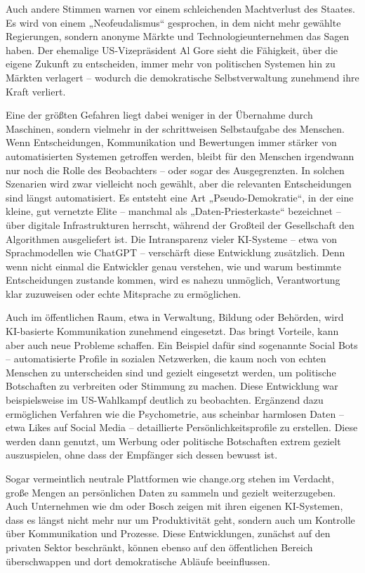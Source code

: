 \documentclass[utf8,biblatex]{bremerhaven_lni}
\begin{document}
Auch andere Stimmen warnen vor einem schleichenden Machtverlust des Staates. Es wird von einem „Neofeudalismus“ gesprochen, in dem nicht mehr gewählte Regierungen, sondern anonyme Märkte und Technologieunternehmen das Sagen haben. Der ehemalige US-Vizepräsident Al Gore sieht die Fähigkeit, über die eigene Zukunft zu entscheiden, immer mehr von politischen Systemen hin zu Märkten verlagert – wodurch die demokratische Selbstverwaltung zunehmend ihre Kraft verliert.

Eine der größten Gefahren liegt dabei weniger in der Übernahme durch Maschinen, sondern vielmehr in der schrittweisen Selbstaufgabe des Menschen. Wenn Entscheidungen, Kommunikation und Bewertungen immer stärker von automatisierten Systemen getroffen werden, bleibt für den Menschen irgendwann nur noch die Rolle des Beobachters – oder sogar des Ausgegrenzten. In solchen Szenarien wird zwar vielleicht noch gewählt, aber die relevanten Entscheidungen sind längst automatisiert. Es entsteht eine Art „Pseudo-Demokratie“, in der eine kleine, gut vernetzte Elite – manchmal als „Daten-Priesterkaste“ bezeichnet – über digitale Infrastrukturen herrscht, während der Großteil der Gesellschaft den Algorithmen ausgeliefert ist. Die Intransparenz vieler KI-Systeme – etwa von Sprachmodellen wie ChatGPT – verschärft diese Entwicklung zusätzlich. Denn wenn nicht einmal die Entwickler genau verstehen, wie und warum bestimmte Entscheidungen zustande kommen, wird es nahezu unmöglich, Verantwortung klar zuzuweisen oder echte Mitsprache zu ermöglichen.

Auch im öffentlichen Raum, etwa in Verwaltung, Bildung oder Behörden, wird KI-basierte Kommunikation zunehmend eingesetzt. Das bringt Vorteile, kann aber auch neue Probleme schaffen. Ein Beispiel dafür sind sogenannte Social Bots – automatisierte Profile in sozialen Netzwerken, die kaum noch von echten Menschen zu unterscheiden sind und gezielt eingesetzt werden, um politische Botschaften zu verbreiten oder Stimmung zu machen. Diese Entwicklung war beispielsweise im US-Wahlkampf deutlich zu beobachten. Ergänzend dazu ermöglichen Verfahren wie die Psychometrie, aus scheinbar harmlosen Daten – etwa Likes auf Social Media – detaillierte Persönlichkeitsprofile zu erstellen. Diese werden dann genutzt, um Werbung oder politische Botschaften extrem gezielt auszuspielen, ohne dass der Empfänger sich dessen bewusst ist.

Sogar vermeintlich neutrale Plattformen wie change.org stehen im Verdacht, große Mengen an persönlichen Daten zu sammeln und gezielt weiterzugeben. Auch Unternehmen wie dm oder Bosch zeigen mit ihren eigenen KI-Systemen, dass es längst nicht mehr nur um Produktivität geht, sondern auch um Kontrolle über Kommunikation und Prozesse. Diese Entwicklungen, zunächst auf den privaten Sektor beschränkt, können ebenso auf den öffentlichen Bereich überschwappen und dort demokratische Abläufe beeinflussen.
\end{document}
